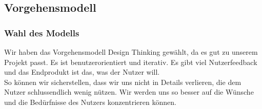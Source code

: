 \documentclass[10pt]{article}
\begin{document}
	\subsection{Vorgehensmodell}
	\subsubsection{Wahl des Modells}
	Wir haben das Vorgehensmodell Design Thinking gewählt, da es gut zu unserem Projekt passt. Es ist benutzerorientiert und iterativ. Es gibt viel Nutzerfeedback und das Endprodukt ist das, was der Nutzer will.\\
	So können wir sicherstellen, dass wir uns nicht in Details verlieren, die dem Nutzer schlussendlich wenig nützen. Wir werden uns so besser auf die Wünsche und die Bedürfnisse des Nutzers konzentrieren können.
\end{document}
